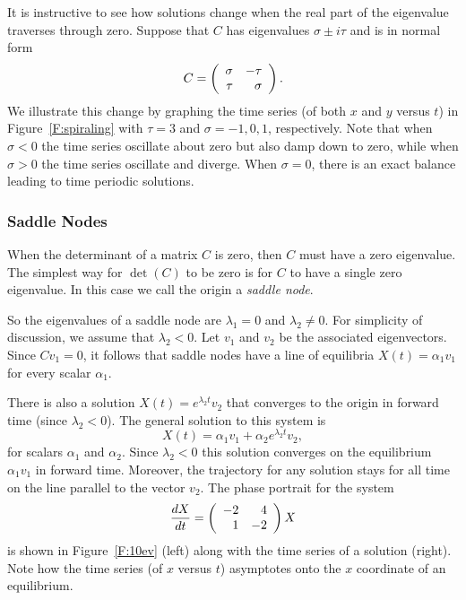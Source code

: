 \documentclass{ximera}
\begin{document}
\begin{figure*}[htb]
     \centerline{%
     }
     \caption{(Left) Solutions to $\dot{X}=BX$ for $\tau=3$.
	(Right) Time series of a solution illustrating time periodicity.}
     \label{F:center}
\end{figure*}

It is instructive to see how solutions change when the real part of the
eigenvalue traverses through zero.  Suppose that $C$ has eigenvalues
$\sigma\pm i\tau$ and is in normal form
\[
C = \left(\begin{array}{rr} \sigma & -\tau\\ \tau &\sigma\end{array}\right).
\]
We illustrate this change by graphing the time series (of both $x$ and $y$
versus $t$) in Figure~\ref{F:spiraling} with $\tau=3$ and $\sigma=-1,0,1$,
respectively. Note that when $\sigma<0$ the time series oscillate about zero
but also damp down to zero, while when $\sigma>0$ the time series oscillate
and diverge.  When $\sigma = 0$, there is an exact balance leading to time
periodic solutions.

\begin{figure*}[htb]
     \centerline{%
     }
     \caption{Solutions of $\dot{X}=BX$ for $\tau=3$ and $\sigma=-1,0,1$.}
     \label{F:spiraling}
\end{figure*}

\subsubsection*{Saddle Nodes}

When the determinant of a matrix $C$ is zero, then $C$ must have a zero
eigenvalue.  The simplest way for $\det(C)$ to be zero is for $C$ to have a
single zero eigenvalue.  In this case we call the origin a {\em saddle node}.

So the eigenvalues of a saddle node are $\lambda_1=0$ and $\lambda_2\neq 0$.
For simplicity of discussion, we assume that $\lambda_2<0$.  Let $v_1$ and
$v_2$ be the associated eigenvectors.  Since $Cv_1=0$, it follows that saddle
nodes have a line of equilibria
$X(t)=\alpha_1v_1$ for every scalar $\alpha_1$.

There is also a solution $X(t)=e^{\lambda_2 t}v_2$ that converges to the
origin in forward time (since $\lambda_2<0$).  The general solution to this
system is
\[
X(t) = \alpha_1 v_1 + \alpha_2 e^{\lambda_2 t}v_2,
\]
for scalars $\alpha_1$ and $\alpha_2$.  Since $\lambda_2<0$ this solution
converges on the equilibrium $\alpha_1 v_1$ in forward time.  Moreover,
the trajectory for any solution stays for all time on the line parallel
to the vector $v_2$.  The phase portrait
for the system
\begin{equation}  \label{e:10ev}
\frac{dX}{dt} = \left(\begin{array}{rr} -2 & 4\\ 1 &-2\end{array}\right) X
\end{equation}
is shown in Figure~\ref{F:10ev} (left) along with the time series
of a solution (right).  Note how the time series (of $x$ versus $t$)
asymptotes onto the $x$ coordinate of an equilibrium.
\end{document}
